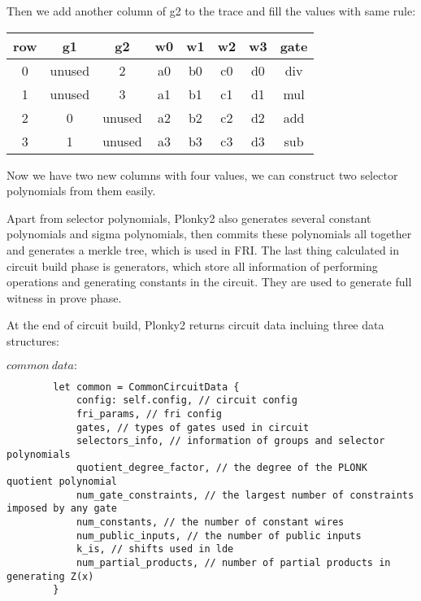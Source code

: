    Then we add another column of g2 to the trace and fill the values with same rule:

    \begin{center}
        \begin{tabular}{ |c|c|c|c|c|c|c|c| }
            \hline
            row & g1 & g2 & w0 & w1 & w2 & w3 & gate \\
            \hline
            0 & unused & 2 & a0 & b0 & c0 & d0 & div \\
            \hline
            1 & unused & 3 & a1 & b1 & c1 & d1 & mul \\
            \hline
            2 & 0 & unused & a2 & b2 & c2 & d2 & add \\
            \hline
            3 & 1 & unused & a3 & b3 & c3 & d3 & sub \\
            \hline
        \end{tabular}
    \end{center}

    Now we have two new columns with four values, we can construct two selector polynomials from 
    them easily.

    Apart from selector polynomials, Plonky2 also generates several constant polynomials and sigma
    polynomials, then commits these polynomials all together and generates a merkle tree, which is 
    used in FRI. The last thing calculated in circuit build phase is generators, which store all 
    information of performing operations and generating constants in the circuit. They are used to
    generate full witness in prove phase.

    At the end of circuit build, Plonky2 returns circuit data incluing three data structures:
    
    $common\ data:$

    \begin{lstlisting}
        let common = CommonCircuitData {
            config: self.config, // circuit config
            fri_params, // fri config
            gates, // types of gates used in circuit
            selectors_info, // information of groups and selector polynomials
            quotient_degree_factor, // the degree of the PLONK quotient polynomial
            num_gate_constraints, // the largest number of constraints imposed by any gate
            num_constants, // the number of constant wires
            num_public_inputs, // the number of public inputs
            k_is, // shifts used in lde
            num_partial_products, // number of partial products in generating Z(x)
        }
    \end{lstlisting}

